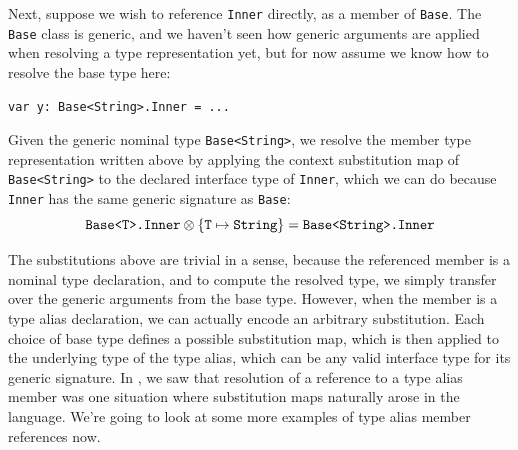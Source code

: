 \documentclass[../generics]{subfiles}
\begin{document}
Next, suppose we wish to reference \texttt{Inner} directly, as a member of \texttt{Base}. The \texttt{Base} class is generic, and we haven't seen how generic arguments are applied when resolving a type representation yet, but for now assume we know how to resolve the base type here:
\begin{Verbatim}
var y: Base<String>.Inner = ...
\end{Verbatim}
Given the generic nominal type \texttt{Base<String>}, we resolve the member type representation written above by applying the context substitution map of \texttt{Base<String>} to the declared interface type of \texttt{Inner}, which we can do because \texttt{Inner} has the same generic signature as \texttt{Base}:
\[\texttt{Base<T>.Inner}\otimes\{\texttt{T} \mapsto \texttt{String}\}=\texttt{Base<String>.Inner}\]

The substitutions above are trivial in a sense, because the referenced member is a nominal type declaration, and to compute the resolved type, we simply transfer over the generic arguments from the base type. However, when the member is a type alias declaration, we can actually encode an arbitrary substitution. Each choice of base type defines a possible substitution map, which is then applied to the underlying type of the type alias, which can be any valid interface type for its generic signature. In , we saw that resolution of a reference to a type alias member was one situation where substitution maps naturally arose in the language. We're going to look at some more examples of type alias member references now.

\smallskip
\end{document}
